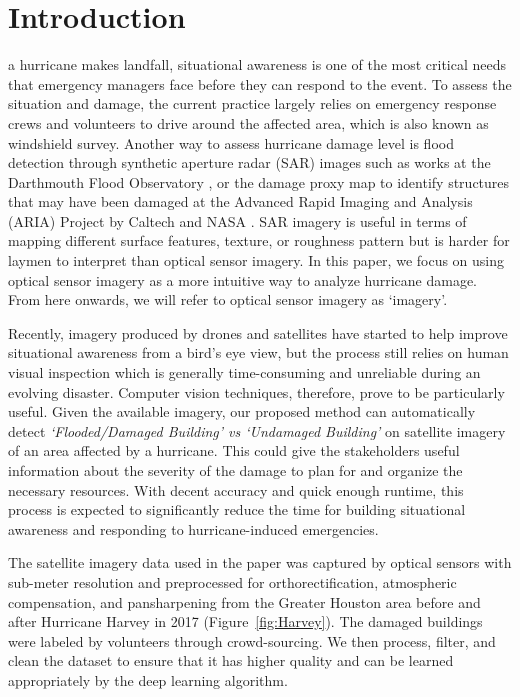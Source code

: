 \documentclass[journal, 12pt, onecolumn,draftclsnofoot]{IEEEtran}
\begin{document}
\section{Introduction}
 a hurricane makes landfall, situational awareness is one of the most critical needs that emergency managers face before they can respond to the event. To assess the situation and damage, the current practice largely relies on emergency response crews and volunteers to drive around the affected area, which is also known as windshield survey. Another way to assess hurricane damage level is flood detection through synthetic aperture radar (SAR) images such as works at the Darthmouth Flood Observatory \cite{dfo}, or the damage proxy map to identify structures that may have been damaged at the Advanced Rapid Imaging and Analysis (ARIA) Project by Caltech and NASA \cite{aria}. SAR imagery is useful in terms of mapping different surface features, texture, or roughness pattern but is harder for laymen to interpret than optical sensor imagery. %
In this paper, we focus on using optical sensor imagery as a more intuitive way to analyze hurricane damage. From here onwards, we will refer to optical sensor imagery as `imagery'.

Recently, imagery produced by drones and satellites have started to help improve situational awareness from a bird's eye view, but the process still relies on human visual inspection which is generally time-consuming and unreliable during an evolving disaster. Computer vision techniques, therefore, prove to be particularly useful. Given the available imagery, our proposed method can automatically detect \textit{`Flooded/Damaged Building' vs `Undamaged Building'} on satellite imagery of an area affected by a hurricane. This could give the stakeholders useful information about the severity of the damage to plan for and organize the necessary resources. With decent accuracy and quick enough runtime, this process is expected to significantly reduce the time for building situational awareness and responding to hurricane-induced emergencies. 

The satellite imagery data used in the paper was captured by optical sensors with sub-meter resolution and preprocessed for orthorectification, atmospheric compensation, and pansharpening from the Greater Houston area before and after Hurricane Harvey in 2017 (Figure~\ref{fig:Harvey}). The damaged buildings were labeled by volunteers through crowd-sourcing. We then process, filter, and clean the dataset to ensure that it has higher quality and can be learned appropriately by the deep learning algorithm. 
\end{document}

